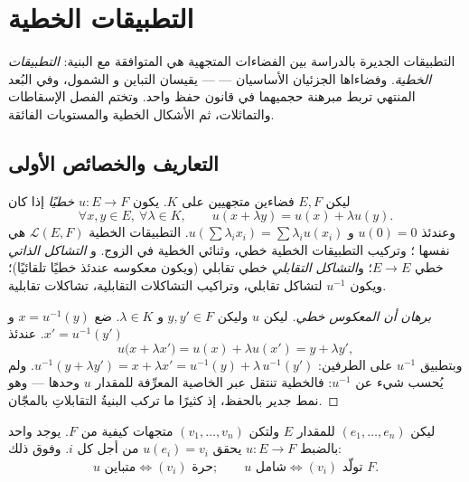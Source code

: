 \chapter{التطبيقات الخطية}\label{ch:b1:linmaps}

التطبيقات الجديرة بالدراسة بين الفضاءات المتجهية هي المتوافقة
مع البنية: \emph{التطبيقات الخطية}. وفضاءاها الجزئيان
الأساسيان ---   --- يقيسان التباين و
الشمول، وفي البُعد المنتهي تربط مبرهنة 
حجميهما في قانون حفظ واحد. وتختم الفصل الإسقاطات
والتماثلات، ثم الأشكال الخطية والمستويات الفائقة.

\section{التعاريف والخصائص الأولى}

\begin{definition}\label{def:b1:linmaps:def}
ليكن $E, F$ فضاءين متجهيين على $K$. يكون  $u \colon E \to F$
\emph{خطيًا} إذا كان
\[
\forall x, y \in E,\ \forall \lambda \in K, \qquad
u(x + \lambda y) = u(x) + \lambda u(y).
\]
وعندئذ $u(0) = 0$ و $u(\sum \lambda_i x_i) = \sum \lambda_i u(x_i)$.
 التطبيقات الخطية $\mathcal{L}(E, F)$ هي نفسها ؛
وتركيب التطبيقات الخطية خطي، وثنائي الخطية في الزوج. و
\emph{التشاكل الذاتي}  خطي $E \to E$؛ و\emph{التشاكل التقابلي}
 خطي تقابلي (ويكون معكوسه عندئذ خطيًا تلقائيًا)؛
ويكون $u^{-1}$ لتشاكل تقابلي، وتراكيب التشاكلات التقابلية،
تشاكلات تقابلية.
\end{definition}

\begin{proof}[برهان أن المعكوس خطي]
ليكن $u$   وليكن $y, y' \in F$ و $\lambda \in K$.
ضع $x = u^{-1}(y)$ و $x' = u^{-1}(y')$. عندئذ
\[
u\bigl(x + \lambda x'\bigr) = u(x) + \lambda u(x')
= y + \lambda y' ,
\]
وبتطبيق $u^{-1}$ على الطرفين: $u^{-1}(y + \lambda y') = x
+ \lambda x' = u^{-1}(y) + \lambda\,u^{-1}(y')$. ولم يُحسب شيء عن
$u^{-1}$: فالخطية تنتقل عبر الخاصية المعرِّفة
للمقدار $u$ وحدها --- وهو نمط جدير بالحفظ،
إذ كثيرًا ما تركب البنيةُ التقابلاتِ بالمجّان.
\end{proof}

\begin{proposition}\label{prop:b1:linmaps:basis}
ليكن $(e_1, \dots, e_n)$  للمقدار $E$ ولتكن $(v_1, \dots, v_n)$
متجهات كيفية من $F$. يوجد  واحد بالضبط $u \colon
E \to F$ يحقق $u(e_i) = v_i$ من أجل كل $i$. وفوق ذلك:
\[
u \text{ متباين} \iff (v_i) \text{ حرة};
\qquad
u \text{ شامل} \iff (v_i) \text{ تولّد } F .
\]
\end{proposition}


